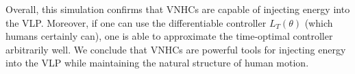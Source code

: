 Overall, this simulation confirms that VNHCs are capable of injecting energy
into the VLP. 
Moreover, if one can use the differentiable controller \(L_T(\theta)\) (which
humans certainly can), one is able to approximate the time-optimal controller
arbitrarily well.
We conclude that VNHCs are powerful tools for injecting energy into the VLP
while maintaining the natural structure of human motion.

